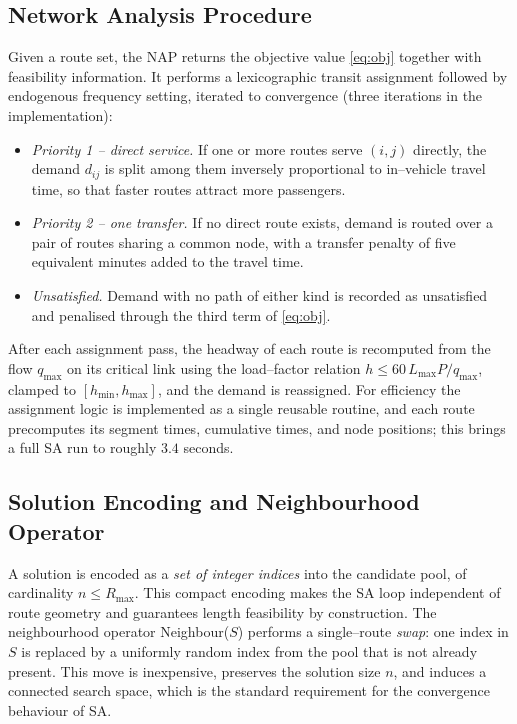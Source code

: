 \documentclass [a4paper, 11pt, titlepage] {article}
\begin{document}
\subsection{Network Analysis Procedure}
Given a route set, the NAP returns the objective value \eqref{eq:obj} together
with feasibility information. It performs a lexicographic transit assignment
followed by endogenous frequency setting, iterated to convergence (three
iterations in the implementation):
\begin{itemize}
\item \emph{Priority 1 -- direct service.} If one or more routes serve $(i,j)$
directly, the demand $d_{ij}$ is split among them inversely proportional to
in--vehicle travel time, so that faster routes attract more passengers.
\item \emph{Priority 2 -- one transfer.} If no direct route exists, demand is
routed over a pair of routes sharing a common node, with a transfer penalty of
five equivalent minutes added to the travel time.
\item \emph{Unsatisfied.} Demand with no path of either kind is recorded as
unsatisfied and penalised through the third term of \eqref{eq:obj}.
\end{itemize}
After each assignment pass, the headway of each route is recomputed from the
flow $q_{\max}$ on its critical link using the load--factor relation
$h \leq 60\,L_{\max}P/q_{\max}$, clamped to $[h_{\min},h_{\max}]$, and the demand
is reassigned. For efficiency the assignment logic is implemented as a single
reusable routine, and each route precomputes its segment times, cumulative
times, and node positions; this brings a full SA run to roughly $3.4$ seconds.

\subsection{Solution Encoding and Neighbourhood Operator}
A solution is encoded as a \emph{set of integer indices} into the candidate
pool, of cardinality $n \leq R_{\max}$. This compact encoding makes the SA loop
independent of route geometry and guarantees length feasibility by construction.
The neighbourhood operator Neighbour($S$) performs a single--route \emph{swap}:
one index in $S$ is replaced by a uniformly random index from the pool that is
not already present. This move is inexpensive, preserves the solution size $n$,
and induces a connected search space, which is the standard requirement for the
convergence behaviour of SA.
\end{document}
